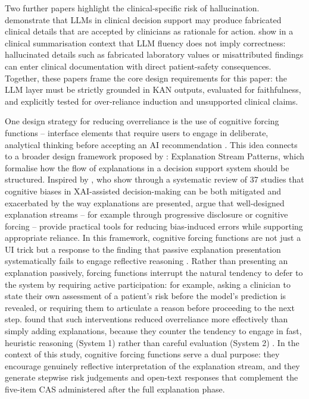 \documentclass[12pt, a4paper]{article}
\begin{document}
Two further papers highlight the clinical-specific risk of hallucination.
\citet{omar2025hallucination} demonstrate that LLMs in clinical
decision support may produce fabricated clinical details that are accepted
by clinicians as rationale for action. \citet{bdawood2025framework} show
in a clinical summarisation context that LLM fluency does not imply
correctness: hallucinated details such as fabricated laboratory values or
misattributed findings can enter clinical documentation with direct
patient-safety consequences. Together, these papers frame the core design
requirements for this paper: the LLM layer must be strictly grounded in
KAN outputs, evaluated for faithfulness, and explicitly tested for
over-reliance induction and unsupported clinical claims.

One design strategy for reducing overreliance is the use of
cognitive forcing functions -- interface elements that require
users to engage in deliberate, analytical thinking before accepting an
AI recommendation \citep{bucinca2021trust}. This idea connects to
a broader design framework proposed by \citet{maathuis2025patterns}:
Explanation Stream Patterns, which formalise how the flow of
explanations in a decision support system should be structured.
Inspired by \citet{bertrand2022biases}, who show through a systematic
review of 37 studies that cognitive biases in XAI-assisted
decision-making can be both mitigated and exacerbated by the way
explanations are presented, \citet{maathuis2025patterns} argue that well-designed
explanation streams -- for example through progressive disclosure or
cognitive forcing -- provide practical tools for reducing
bias-induced errors while supporting appropriate reliance.
In this framework, cognitive forcing functions are not just a UI
trick but a response to the finding that passive
explanation presentation systematically fails to engage reflective
reasoning \citep{bucinca2021trust, bertrand2022biases}. Rather than presenting an
explanation passively, forcing functions interrupt the natural tendency
to defer to the system by requiring active participation: for example,
asking a clinician to state their own assessment of a patient's risk
before the model's prediction is revealed, or requiring them to
articulate a reason before proceeding to the next step.
\citet{bucinca2021trust} found that such interventions reduced
overreliance more effectively than simply adding explanations, because
they counter the tendency to engage in fast, heuristic reasoning
(System 1) rather than careful evaluation (System 2)
\citep{liaovarshney2021human}. In the context of this study,
cognitive forcing functions serve a dual purpose: they encourage
genuinely reflective interpretation of the explanation stream, and they
generate stepwise risk judgements and open-text responses that complement
the five-item CAS administered after the full explanation phase.
\end{document}
